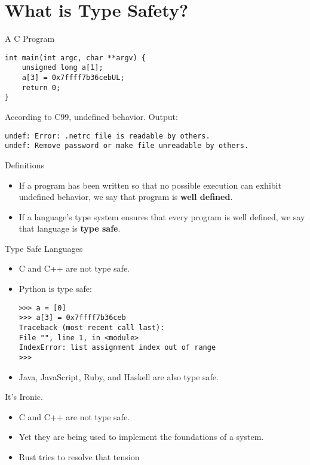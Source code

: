 \section{What is Type Safety?}


\begin{frame}[fragile]{A C Program}
\begin{verbatim}
int main(int argc, char **argv) {
    unsigned long a[1];
    a[3] = 0x7ffff7b36cebUL;
    return 0;
}
\end{verbatim}
	\pause According to C99, undefined behavior. Output:

	{\footnotesize \tt undef: Error: .netrc file is readable by others.\\
	undef: Remove password or make file unreadable by others.}
\end{frame}


\begin{frame}{Definitions}
	\begin{itemize}
		\item If a program has been written so that no possible execution can
			exhibit undefined behavior, we say that program is \textbf{well defined}.
		\item If a language’s type system ensures that every program is well
			defined, we say that language is \textbf{type safe}.
	\end{itemize}
\end{frame}


\begin{frame}[fragile]{Type Safe Languages}
	\begin{itemize}
		\item C and C++ are not type safe.
		\item Python is type safe:
\begin{verbatim}
>>> a = [0]
>>> a[3] = 0x7ffff7b36ceb
Traceback (most recent call last):
File "", line 1, in <module>
IndexError: list assignment index out of range
>>>
\end{verbatim}
		\item Java, JavaScript, Ruby, and Haskell are also type safe.
	\end{itemize}
\end{frame}


\begin{frame}{It's Ironic.}
	\begin{itemize}
		\item C and C++ are not type safe.
		\item Yet they are being used to implement the foundations of a system.
		\item Rust tries to resolve that tension
	\end{itemize}
\end{frame}
